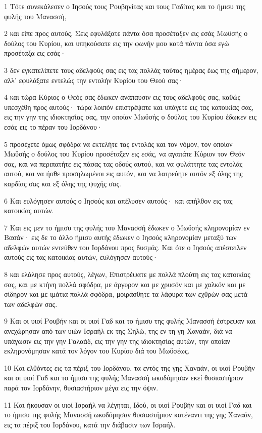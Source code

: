 \par 1 Τότε συνεκάλεσεν ο Ιησούς τους Ρουβηνίτας και τους Γαδίτας και το ήμισυ της φυλής του Μανασσή,
\par 2 και είπε προς αυτούς, Σεις εφυλάξατε πάντα όσα προσέταξεν εις εσάς Μωϋσής ο δούλος του Κυρίου, και υπηκούσατε εις την φωνήν μου κατά πάντα όσα εγώ προσέταξα εις εσάς·
\par 3 δεν εγκατελίπετε τους αδελφούς σας εις τας πολλάς ταύτας ημέρας έως της σήμερον, αλλ' εφυλάξατε εντελώς την εντολήν Κυρίου του Θεού σας·
\par 4 και τώρα Κύριος ο Θεός σας έδωκεν ανάπαυσιν εις τους αδελφούς σας, καθώς υπεσχέθη προς αυτούς· τώρα λοιπόν επιστρέψατε και υπάγετε εις τας κατοικίας σας, εις την γην της ιδιοκτησίας σας, την οποίαν Μωϋσής ο δούλος του Κυρίου έδωκεν εις εσάς εις το πέραν του Ιορδάνου·
\par 5 προσέχετε όμως σφόδρα να εκτελήτε τας εντολάς και τον νόμον, τον οποίον Μωϋσής ο δούλος του Κυρίου προσέταξεν εις εσάς, να αγαπάτε Κύριον τον Θεόν σας, και να περιπατήτε εις πάσας τας οδούς αυτού, και να φυλάττητε τας εντολάς αυτού, και να ήσθε προσηλωμένοι εις αυτόν, και να λατρεύητε αυτόν εξ όλης της καρδίας σας και εξ όλης της ψυχής σας.
\par 6 Και ευλόγησεν αυτούς ο Ιησούς και απέλυσεν αυτούς· και απήλθον εις τας κατοικίας αυτών.
\par 7 Και εις μεν το ήμισυ της φυλής του Μανασσή έδωκεν ο Μωϋσής κληρονομίαν εν Βασάν· εις δε το άλλο ήμισυ αυτής έδωκεν ο Ιησούς κληρονομίαν μεταξύ των αδελφών αυτών εντεύθεν του Ιορδάνου προς δυσμάς. Και ότε ο Ιησούς απέστειλεν αυτούς εις τας κατοικίας αυτών, ευλόγησεν αυτούς·
\par 8 και ελάλησε προς αυτούς, λέγων, Επιστρέψατε με πολλά πλούτη εις τας κατοικίας σας, και με κτήνη πολλά σφόδρα, με άργυρον και με χρυσόν και με χαλκόν και με σίδηρον και με ιμάτια πολλά σφόδρα, μοιράσθητε τα λάφυρα των εχθρών σας μετά των αδελφών σας.
\par 9 Και οι υιοί Ρουβήν και οι υιοί Γαδ και το ήμισυ της φυλής Μανασσή έστρεψαν και ανεχώρησαν από των υιών Ισραήλ εκ της Σηλώ, της εν τη γη Χαναάν, διά να υπάγωσιν εις την γην Γαλαάδ, εις την γην της ιδιοκτησίας αυτών, την οποίαν εκληρονόμησαν κατά τον λόγον του Κυρίου διά του Μωϋσέως.
\par 10 Και ελθόντες εις τα πέριξ του Ιορδάνου, τα εντός της γης Χαναάν, οι υιοί Ρουβήν και οι υιοί Γαδ και το ήμισυ της φυλής Μανασσή ωκοδόμησαν εκεί θυσιαστήριον παρά τον Ιορδάνην, θυσιαστήριον μέγα εις την όψιν.
\par 11 Και ήκουσαν οι υιοί Ισραήλ να λέγηται, Ιδού, οι υιοί Ρουβήν και οι υιοί Γαδ και το ήμισυ της φυλής Μανασσή ωκοδόμησαν θυσιαστήριον κατέναντι της γης Χαναάν, εις τα πέριξ του Ιορδάνου, κατά την διάβασιν των Ισραήλ.
